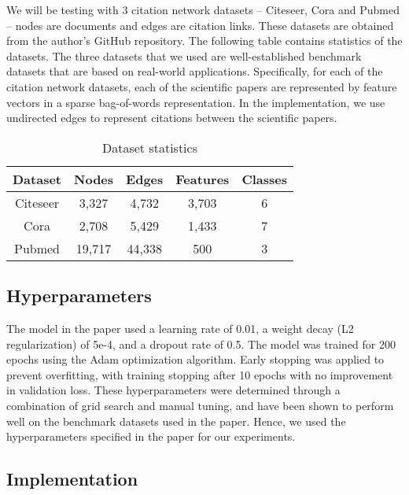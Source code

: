 \documentclass[11pt,a4paper]{article}
\begin{document}
We will be testing with 3 citation network datasets -- Citeseer, Cora and Pubmed -- nodes are documents and edges are citation links. These datasets are obtained from the author's GitHub repository. The following table contains statistics of the datasets. The three datasets that we used are well-established benchmark datasets that are based on real-world applications. Specifically, for each of the citation network datasets, each of the scientific papers are represented by feature vectors in a sparse bag-of-words representation. In the implementation, we use undirected edges to represent citations between the scientific papers.

\begin{table}[h]
\centering
\begin{tabular}{|c|c|c|c|c|}
\hline
Dataset & Nodes & Edges & Features & Classes \\ \hline
Citeseer & 3,327 & 4,732 & 3,703 & 6 \\ \hline
Cora & 2,708 & 5,429 & 1,433 & 7 \\ \hline
Pubmed & 19,717 & 44,338 & 500 & 3 \\ \hline
\end{tabular}
\caption{Dataset statistics}
\end{table}

\subsection{Hyperparameters}

The model in the paper used a learning rate of 0.01, a weight decay (L2 regularization) of 5e-4, and a dropout rate of 0.5. The model was trained for 200 epochs using the Adam optimization algorithm. Early stopping was applied to prevent overfitting, with training stopping after 10 epochs with no improvement in validation loss. These hyperparameters were determined through a combination of grid search and manual tuning, and have been shown to perform well on the benchmark datasets used in the paper. Hence, we used the hyperparameters specified in the paper for our experiments.

\subsection{Implementation}
\end{document}
